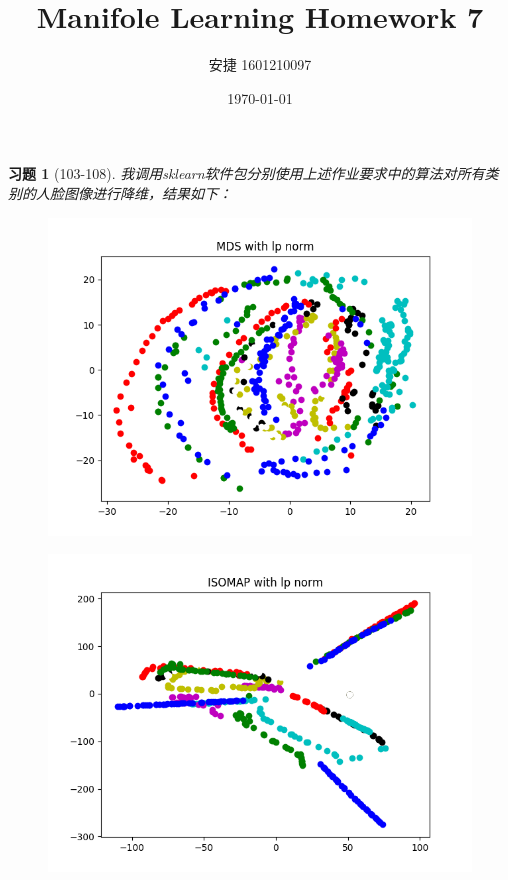 \documentclass[a4paper, UTF8]{ctexart}
\title{Manifole Learning Homework 7}
\date{\today}
\author{安捷 1601210097}
\newtheorem*{exercise}{\textbf{习题}}
\begin{document}
\maketitle
  \begin{exercise}[103-108]
  	我调用sklearn软件包分别使用上述作业要求中的算法对所有类别的人脸图像进行降维，结果如下：\\
  	\begin{figure}[htbp!]
  		\centering
  		\includegraphics[width = \textwidth]{hw7_fig1.png}
  	\end{figure}
  	\clearpage
  	\begin{figure}[htbp!]
  		\centering
  		\includegraphics[width = \textwidth]{hw7_fig2.png}
  	\end{figure}

\end{exercise}
\end{document}
